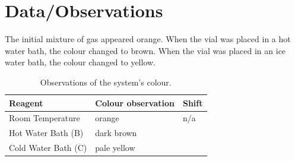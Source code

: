 
\section{Data/Observations}
The initial mixture of gas appeared orange. When the vial was placed in a hot water bath, the colour changed to brown. When the vial was placed in an ice water bath, the colour changed to yellow.

\begin{table}[h]
\centering
\begin{tabular}{|l|l|l|}
\hline
Reagent & Colour observation & Shift \\
\hline
Room Temperature & orange  & n/a \\
\hline
Hot Water Bath (B) & dark brown  &  \\
\hline
Cold Water Bath (C) & pale yellow &  \\
\hline
\end{tabular}
\caption{Observations of the system's colour.}
\label{tab:observations}
\end{table}

